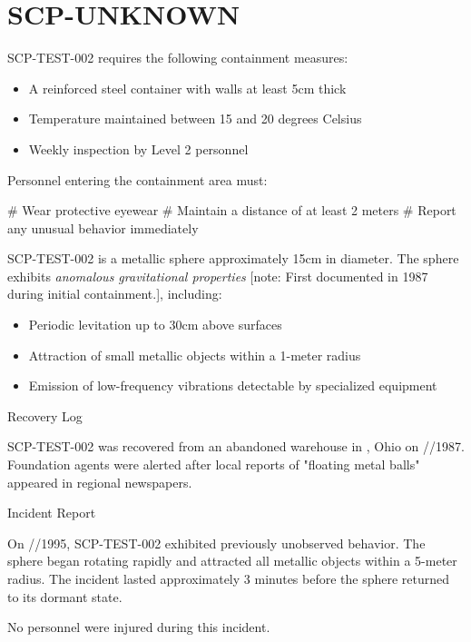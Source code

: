 \section{SCP-UNKNOWN}


\containment

SCP-TEST-002 requires the following containment measures:

\begin{itemize}
\item A reinforced steel container with walls at least 5cm thick
\item Temperature maintained between 15 and 20 degrees Celsius
\item Weekly inspection by Level 2 personnel
\end{itemize}

Personnel entering the containment area must:

\# Wear protective eyewear
\# Maintain a distance of at least 2 meters
\# Report any unusual behavior immediately

\scpdescription

SCP-TEST-002 is a metallic sphere approximately 15cm in diameter. The sphere exhibits \textit{anomalous gravitational properties} [note: First documented in 1987 during initial containment.], including:

\begin{itemize}
\item Periodic levitation up to 30cm above surfaces
\item Attraction of small metallic objects within a 1-meter radius
\item Emission of low-frequency vibrations detectable by specialized equipment
\end{itemize}


Recovery Log

SCP-TEST-002 was recovered from an abandoned warehouse in , Ohio on //1987. Foundation agents were alerted after local reports of "floating metal balls" appeared in regional newspapers.


Incident Report

On //1995, SCP-TEST-002 exhibited previously unobserved behavior. The sphere began rotating rapidly and attracted all metallic objects within a 5-meter radius. The incident lasted approximately 3 minutes before the sphere returned to its dormant state.

No personnel were injured during this incident.

